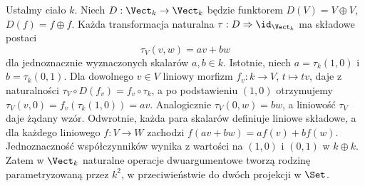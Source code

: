 \begin{przyklad}\label{cat:ex:linear-natural-operations}
Ustalmy ciało $k$. Niech $D:\Vect_k\to\Vect_k$ będzie funktorem $D(V)=V\oplus V$, $D(f)=f\oplus f$. Każda transformacja naturalna $\tau:D\Rightarrow\id_{\Vect_k}$ ma składowe postaci
\[
\tau_V(v,w)=av+bw
\]
dla jednoznacznie wyznaczonych skalarów $a,b\in k$. Istotnie, niech $a=\tau_k(1,0)$ i $b=\tau_k(0,1)$. Dla dowolnego $v\in V$ liniowy morfizm $f_v:k\to V$, $t\mapsto tv$, daje z naturalności $\tau_V\circ D(f_v)=f_v\circ\tau_k$, a po podstawieniu $(1,0)$ otrzymujemy
$\tau_V(v,0)=f_v(\tau_k(1,0))=av$. Analogicznie $\tau_V(0,w)=bw$, a liniowość $\tau_V$ daje żądany wzór. Odwrotnie, każda para skalarów definiuje liniowe składowe, a dla każdego liniowego $f:V\to W$ zachodzi $f(av+bw)=af(v)+bf(w)$. Jednoznaczność współczynników wynika z wartości na $(1,0)$ i $(0,1)$ w $k\oplus k$. Zatem w $\Vect_k$ naturalne operacje dwuargumentowe tworzą rodzinę parametryzowaną przez $k^2$, w przeciwieństwie do dwóch projekcji w $\Set$.
\end{przyklad}
